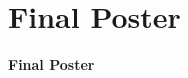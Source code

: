 \newpage
\section{Final Poster}
\vspace{\fill}
	\begin{center}
		{\Huge\bfseries Final Poster\par}
	\end{center}
\vspace{\fill}
\newpage
